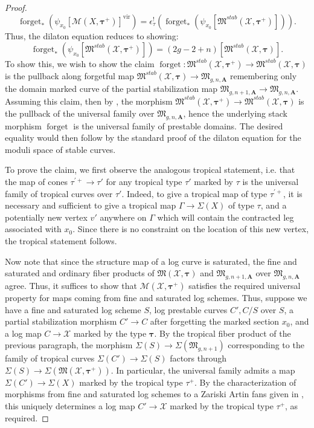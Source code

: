 \documentclass[12pt, oneside]{amsart}   	%
\newcommand{\vir}{\operatorname{vir}}
\newcommand{\forget}{\operatorname{forget}}
\numberwithin{equation}{section}
\numberwithin{thm}{section}
\numberwithin{figure}{section}
\begin{document}
\begin{proof}
\[\forget_*(\psi_{x_0}[\mathscr{M}(X,\pmb\tau^+)]^{\vir}) = \epsilon_{\tau}^!(\forget_*(\psi_{x_0}[\mathfrak{M}^{stab}(\mathcal{X},\pmb\tau^+)])).\]
Thus, the dilaton equation reduces to showing:
\[\forget_*(\psi_{x_0}[\mathfrak{M}^{stab}(\mathcal{X},\pmb\tau^+)]) = (2g-2+n)[\mathfrak{M}^{stab}(\mathcal{X},\pmb\tau)].\]
To show this, we wish to show the claim $\forget: \mathfrak{M}^{stab}(\mathcal{X},\pmb\tau^+)\rightarrow \mathfrak{M}^{stab}(\mathcal{X},\pmb\tau)$ is the pullback along forgetful map $\mathfrak{M}^{stab}(\mathcal{X},\pmb\tau) \rightarrow \mathfrak{M}_{g,n,\textbf{A}}$ remembering only the domain marked curve of the partial stabilization map $\mathfrak{M}_{g,n+1,\textbf{A}} \rightarrow \mathfrak{M}_{g,n,\textbf{A}}$. Assuming this claim, then by \cite[Proposition $2.1.1$]{Cos}, the morphism $\mathfrak{M}^{stab}(\mathcal{X},\pmb\tau^+) \rightarrow \mathfrak{M}^{stab}(\mathcal{X},\pmb\tau)$ is the pullback of the universal family over $\mathfrak{M}_{g,n,\textbf{A}}$, hence the underlying stack morphism $\forget$ is the universal family of prestable domains. The desired equality would then follow by the standard proof of the dilaton equation for the moduli space of stable curves. 

To prove the claim, we first observe the analogous tropical statement, i.e. that the map of cones $\tau^{'+} \rightarrow \tau'$ for any tropical type $\tau'$ marked by $\tau$ is the universal family of tropical curves over $\tau'$. Indeed, to give a tropical map of type $\tau^{'+}$, it is necessary and sufficient to give a tropical map $\Gamma \rightarrow \Sigma(X)$ of type $\tau$, and a potentially new vertex $v'$ anywhere on $\Gamma$ which will contain the contracted leg associated with $x_0$. Since there is no constraint on the location of this new vertex, the tropical statement follows. 

Now note that since the structure map of a log curve is saturated, the fine and saturated and ordinary fiber products of $\mathfrak{M}(\mathcal{X},\pmb\tau)$ and $\mathfrak{M}_{g,n+1,\textbf{A}}$ over $\mathfrak{M}_{g,n,\textbf{A}}$ agree. Thus, it suffices to show that $\mathscr{M}(\mathcal{X},\pmb\tau^+)$ satisfies the required universal property for maps coming from fine and saturated log schemes. Thus, suppose we have a fine and saturated log scheme $S$, log prestable curves $C',C/S$ over $S$, a partial stabilization morphism $C' \rightarrow C$ after forgetting the marked section $x_0$, and a log map $C \rightarrow \mathcal{X}$ marked by the type $\pmb\tau$. By the tropical fiber product of the previous paragraph, the morphism $\Sigma(S) \rightarrow \Sigma(\mathfrak{M}_{g,n+1})$ corresponding to the family of tropical curves $\Sigma(C')\rightarrow \Sigma(S)$ factors through $\Sigma(S) \rightarrow \Sigma(\mathfrak{M}(\mathcal{X},\pmb\tau^+))$. In particular, the universal family admits a map $\Sigma(C') \rightarrow \Sigma(X)$ marked by the tropical type $\tau^+$. By the characterization of morphisms from fine and saturated log schemes to a Zariski Artin fans given in \cite[Proposition $2.10$]{decomp}, this uniquely determines a log map $C' \rightarrow \mathcal{X}$ marked by the tropical type $\tau^+$, as required. 



\end{proof}
\end{document}
